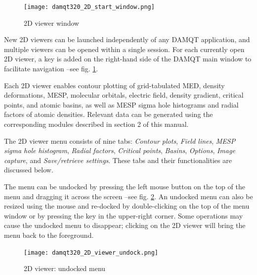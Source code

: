 \documentclass[10pt]{article}
\begin{document}
\vspace*{5mm}

\begin{figure}[H]
\begin{center}
\vspace*{0mm}
\texttt{[image: damqt320\_2D\_start\_window.png]}
\end{center}
\vspace*{0cm}
\caption{{2D viewer window}\label{fig:3_1}}
\end{figure}

\vspace*{5mm}

New 2D viewers can be launched independently of any DAMQT application,  
and multiple viewers can be opened within a single session.  
For each currently open 2D viewer, a key is added on the right-hand side of the DAMQT  
main window to facilitate navigation --see fig. \ref{fig:3_1}.  

Each 2D viewer enables contour plotting of grid-tabulated  
MED, density deformations, MESP, molecular orbitals, electric field, density gradient,  
critical points, and atomic basins, as well as MESP sigma hole histograms  
and radial factors of atomic densities.  
Relevant data can be generated using the corresponding modules described in section 2 of this manual.  

The 2D viewer menu consists of nine tabs:  
{\it Contour plots}, {\it Field lines}, {\it MESP sigma hole histogram}, {\it Radial factors},  
{\it Critical points}, {\it Basins}, {\it Options}, {\it Image capture}, and {\it Save/retrieve settings}.  
These tabs and their functionalities are discussed below.  

The menu can be undocked by pressing the left mouse button on the top of the menu  
and dragging it across the screen --see fig. \ref{fig:3_2}.  
An undocked menu can also be resized using the mouse and re-docked  
by double-clicking on the top of the menu window or by pressing the \undock key in the upper-right corner.  
Some operations may cause the undocked menu to disappear;  
clicking on the 2D viewer will bring the menu back to the foreground.


\begin{figure}[H]
    \begin{center}
        \texttt{[image: damqt320\_2D\_viewer\_undock.png]}
    \end{center}
    \caption{2D viewer: undocked menu \label{fig:3_2}}
\end{figure}
\end{document}
